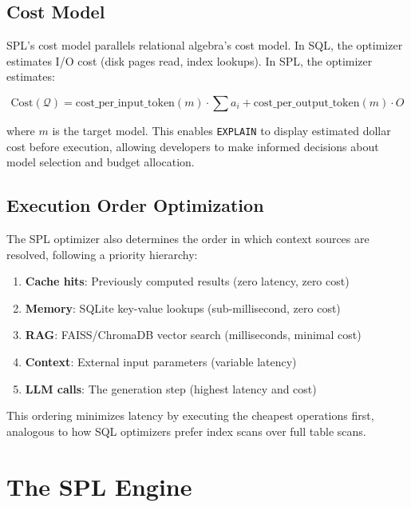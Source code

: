 \documentclass[11pt,a4paper]{article}
\begin{document}
\subsection{Cost Model}

SPL's cost model parallels relational algebra's cost model. In SQL, the optimizer estimates I/O cost (disk pages read, index lookups). In SPL, the optimizer estimates:

\begin{equation}
\text{Cost}(\mathcal{Q}) = \text{cost\_per\_input\_token}(m) \cdot \sum a_i + \text{cost\_per\_output\_token}(m) \cdot O
\end{equation}

where $m$ is the target model. This enables \texttt{EXPLAIN} to display estimated dollar cost before execution, allowing developers to make informed decisions about model selection and budget allocation.

\subsection{Execution Order Optimization}

The SPL optimizer also determines the order in which context sources are resolved, following a priority hierarchy:

\begin{enumerate}[nosep]
  \item \textbf{Cache hits}: Previously computed results (zero latency, zero cost)
  \item \textbf{Memory}: SQLite key-value lookups (sub-millisecond, zero cost)
  \item \textbf{RAG}: FAISS/ChromaDB vector search (milliseconds, minimal cost)
  \item \textbf{Context}: External input parameters (variable latency)
  \item \textbf{LLM calls}: The generation step (highest latency and cost)
\end{enumerate}

This ordering minimizes latency by executing the cheapest operations first, analogous to how SQL optimizers prefer index scans over full table scans.

\section{The SPL Engine}
\label{sec:engine}
\end{document}
